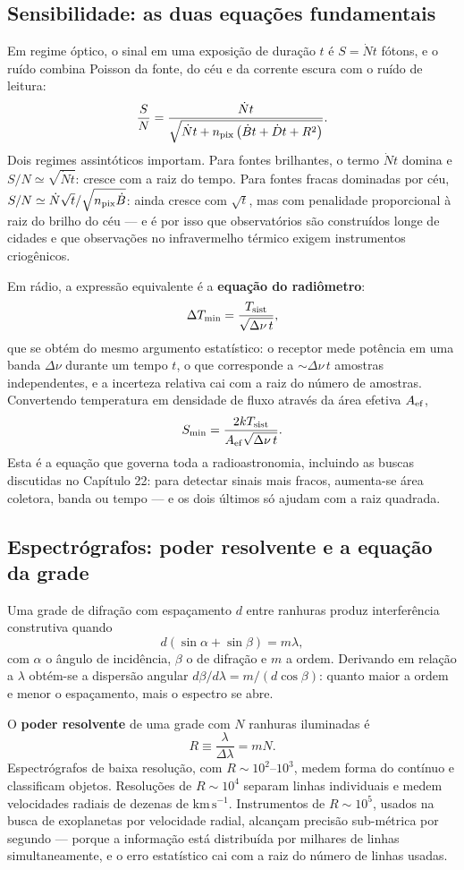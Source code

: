 \documentclass[11pt,a4paper]{article}
\begin{document}
\subsection*{Sensibilidade: as duas equações fundamentais}

Em regime óptico, o sinal em uma exposição de duração $t$ é $S=\dot{N}t$ fótons, e o ruído combina Poisson da fonte, do céu e da corrente escura com o ruído de leitura:
\[
\frac{S}{N}=\frac{\dot{N}t}{\sqrt{\dot{N}t+n_{\rm pix}\left(\dot{B}t+\dot{D}t+R^{2}\right)}}.
\]
Dois regimes assintóticos importam. Para fontes brilhantes, o termo $\dot{N}t$ domina e $S/N\simeq\sqrt{\dot{N}t}$: cresce com a raiz do tempo. Para fontes fracas dominadas por céu, $S/N\simeq\dot{N}\sqrt{t}/\sqrt{n_{\rm pix}\dot{B}}$: ainda cresce com $\sqrt{t}$, mas com penalidade proporcional à raiz do brilho do céu --- e é por isso que observatórios são construídos longe de cidades e que observações no infravermelho térmico exigem instrumentos criogênicos.

Em rádio, a expressão equivalente é a \textbf{equação do radiômetro}:
\[
\Delta T_{\rm min}=\frac{T_{\rm sist}}{\sqrt{\Delta\nu\,t}},
\]
que se obtém do mesmo argumento estatístico: o receptor mede potência em uma banda $\Delta\nu$ durante um tempo $t$, o que corresponde a $\sim\Delta\nu\,t$ amostras independentes, e a incerteza relativa cai com a raiz do número de amostras. Convertendo temperatura em densidade de fluxo através da área efetiva $A_{\rm ef}$,
\[
S_{\rm min}=\frac{2kT_{\rm sist}}{A_{\rm ef}\sqrt{\Delta\nu\,t}}.
\]
Esta é a equação que governa toda a radioastronomia, incluindo as buscas discutidas no Capítulo 22: para detectar sinais mais fracos, aumenta-se área coletora, banda ou tempo --- e os dois últimos só ajudam com a raiz quadrada.

\subsection*{Espectrógrafos: poder resolvente e a equação da grade}

Uma grade de difração com espaçamento $d$ entre ranhuras produz interferência construtiva quando
\[
d(\sin\alpha+\sin\beta)=m\lambda,
\]
com $\alpha$ o ângulo de incidência, $\beta$ o de difração e $m$ a ordem. Derivando em relação a $\lambda$ obtém-se a dispersão angular $d\beta/d\lambda=m/(d\cos\beta)$: quanto maior a ordem e menor o espaçamento, mais o espectro se abre.

O \textbf{poder resolvente} de uma grade com $N$ ranhuras iluminadas é
\[
R\equiv\frac{\lambda}{\Delta\lambda}=mN.
\]
Espectrógrafos de baixa resolução, com $R\sim10^{2}$--$10^{3}$, medem forma do contínuo e classificam objetos. Resoluções de $R\sim10^{4}$ separam linhas individuais e medem velocidades radiais de dezenas de $\mathrm{km\,s^{-1}}$. Instrumentos de $R\sim10^{5}$, usados na busca de exoplanetas por velocidade radial, alcançam precisão sub-métrica por segundo --- porque a informação está distribuída por milhares de linhas simultaneamente, e o erro estatístico cai com a raiz do número de linhas usadas.
\end{document}
